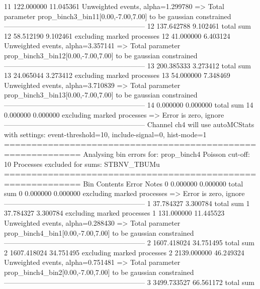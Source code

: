 11         122.000000      11.045361       Unweighted events, alpha=1.299780
  => Total parameter prop_binch3_bin11[0.00,-7.00,7.00] to be gaussian constrained
------------------------------------------------------------
12         137.642788      9.102461        total sum                     
12         58.512190       9.102461        excluding marked processes    
12         41.000000       6.403124        Unweighted events, alpha=3.357141
  => Total parameter prop_binch3_bin12[0.00,-7.00,7.00] to be gaussian constrained
------------------------------------------------------------
13         200.385333      3.273412        total sum                     
13         24.065044       3.273412        excluding marked processes    
13         54.000000       7.348469        Unweighted events, alpha=3.710839
  => Total parameter prop_binch3_bin13[0.00,-7.00,7.00] to be gaussian constrained
------------------------------------------------------------
14         0.000000        0.000000        total sum                     
14         0.000000        0.000000        excluding marked processes    
  => Error is zero, ignore      
------------------------------------------------------------
Channel ch4 will use autoMCStats with settings: event-threshold=10, include-signal=0, hist-mode=1
============================================================
Analysing bin errors for: prop_binch4
Poisson cut-off: 10
Processes excluded for sums: STBNV_TBUMu
============================================================
Bin        Contents        Error           Notes                         
0          0.000000        0.000000        total sum                     
0          0.000000        0.000000        excluding marked processes    
  => Error is zero, ignore      
------------------------------------------------------------
1          37.784327       3.300784        total sum                     
1          37.784327       3.300784        excluding marked processes    
1          131.000000      11.445523       Unweighted events, alpha=0.288430
  => Total parameter prop_binch4_bin1[0.00,-7.00,7.00] to be gaussian constrained
------------------------------------------------------------
2          1607.418024     34.751495       total sum                     
2          1607.418024     34.751495       excluding marked processes    
2          2139.000000     46.249324       Unweighted events, alpha=0.751481
  => Total parameter prop_binch4_bin2[0.00,-7.00,7.00] to be gaussian constrained
------------------------------------------------------------
3          3499.733527     66.561172       total sum                     
